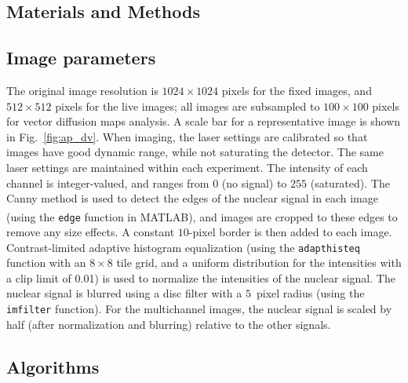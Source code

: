 \documentclass{pnastwo}
\newcommand{\fig}[0]{Fig.}
\begin{document}
\begin{article}


\section{Materials and Methods}

\subsection{Image parameters}

The original image resolution is $1024 \times 1024$ pixels for the fixed images, and $512 \times 512$ pixels for the live images; all images are subsampled to $100 \times 100$ pixels for vector diffusion maps analysis.
%
A scale bar for a representative image is shown in \fig~\ref{fig:ap_dv}.
%
When imaging, the laser settings are calibrated so that images have good dynamic range, while not saturating the detector.
%
The same laser settings are maintained within each experiment.
%
The intensity of each channel is integer-valued, and ranges from $0$ (no signal) to $255$ (saturated). 
%
The Canny method is used to detect the edges of the nuclear signal in each image (using the \texttt{edge} function in MATLAB\textsuperscript{\textregistered}), and images are cropped to these edges to remove any size effects.
%
A constant $10$-pixel border is then added to each image. 
%
Contrast-limited adaptive histogram equalization (using the \texttt{adapthisteq} function with an $8 \times 8$ tile grid, and a uniform distribution for the intensities with a clip limit of 0.01) is used to normalize the intensities of the nuclear signal.
%
The nuclear signal is blurred using a disc filter with a $5$~pixel radius (using the \texttt{imfilter} function).
%
For the multichannel images, the nuclear signal is scaled by half (after normalization and blurring) relative to the other signals.


\subsection{Algorithms}


\end{article}
\end{document}
